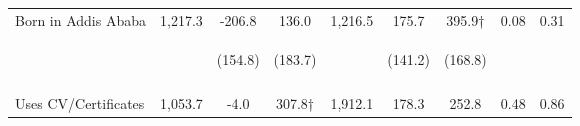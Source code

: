 \begin{tabular}{lcccccccc}
\noalign{\smallskip}Born in Addis Ababa & 1,217.3 & -206.8 & 136.0 & 1,216.5 & 175.7 & 395.9† & 0.08 & 0.31\\
 & \begin{footnotesize}\end{footnotesize} & \begin{footnotesize}(154.8)\end{footnotesize} & \begin{footnotesize}(183.7)\end{footnotesize} & \begin{footnotesize}\end{footnotesize} & \begin{footnotesize}(141.2)\end{footnotesize} & \begin{footnotesize}(168.8)\end{footnotesize} & \begin{footnotesize}\end{footnotesize} & \begin{footnotesize}\end{footnotesize}\\
 & \begin{footnotesize}\end{footnotesize} & \begin{footnotesize}[1.000]\end{footnotesize} & \begin{footnotesize}[0.114]\end{footnotesize} & \begin{footnotesize}\end{footnotesize} & \begin{footnotesize}[1.000]\end{footnotesize} & \begin{footnotesize}[0.160]\end{footnotesize} & \begin{footnotesize}\end{footnotesize} & \begin{footnotesize}\end{footnotesize}\\
\noalign{\smallskip}Uses CV/Certificates & 1,053.7 & -4.0 & 307.8† & 1,912.1 & 178.3 & 252.8 & 0.48 & 0.86\\

\end{tabular}
